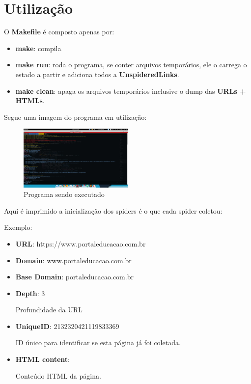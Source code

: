 \section{Utilização}

O \textbf{Makefile} é composto apenas por:

\begin{itemize}
  \item \textbf{make}: compila
  \item \textbf{make run}: roda o programa, se conter arquivos temporários, ele o carrega o estado a partir e adiciona todos a \textbf{UnspideredLinks}.
  \item \textbf{make clean}: apaga os arquivos temporários inclusive o dump das \textbf{URLs + HTMLs}.
\end{itemize}

Segue uma imagem do programa em utilização:

\begin{figure}[h]
  \includegraphics[width=0.5\textwidth]{images/aux2.png}
  \caption{Programa sendo executado}
  \label{fig2}
\end{figure}

Aqui é imprimido a inicialização dos spiders é o que cada spider coletou:

Exemplo:
\begin{itemize}
  \item \textbf{URL}: https://www.portaleducacao.com.br
  \item \textbf{Domain}: www.portaleducacao.com.br
  \item \textbf{Base Domain}: portaleducacao.com.br
  \item \textbf{Depth}: 3

  Profundidade da URL

  \item \textbf{UniqueID}: 2132320421119833369

  ID único para identificar se esta página já foi coletada.

  \item \textbf{HTML content}:

  Conteúdo HTML da página.
\end{itemize}
